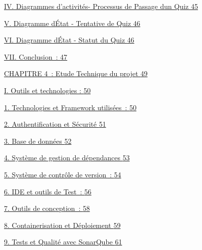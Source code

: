 \documentclass[12pt,a4paper,twoside]{report}
\begin{document}
\protect\hyperlink{diagrammes-dactivituxe9s--processus-de-passage-dun-quiz}{IV.
Diagrammes d'activités- Processus de Passage d\textquotesingle un Quiz
\protect\hyperlink{diagrammes-dactivituxe9s--processus-de-passage-dun-quiz}{45}}

\protect\hyperlink{diagramme-duxe9tat---tentative-de-quiz}{V. Diagramme
d\textquotesingle État - Tentative de Quiz
\protect\hyperlink{diagramme-duxe9tat---tentative-de-quiz}{46}}

\protect\hyperlink{diagramme-duxe9tat---statut-du-quiz}{VI. Diagramme
d\textquotesingle État - Statut du Quiz
\protect\hyperlink{diagramme-duxe9tat---statut-du-quiz}{46}}

\protect\hyperlink{conclusion-2}{VII. Conclusion~:
\protect\hyperlink{conclusion-2}{47}}

\protect\hyperlink{section-5}{CHAPITRE 4~: Etude Technique du projet
\protect\hyperlink{section-5}{49}}

\protect\hyperlink{outils-et-technologies}{I. Outils et technologies :
\protect\hyperlink{outils-et-technologies}{50}}

\protect\hyperlink{technologies-et-framework-utilisuxe9es}{1.
Technologies et Framework utilisées~:
\protect\hyperlink{technologies-et-framework-utilisuxe9es}{50}}

\protect\hyperlink{authentification-et-suxe9curituxe9}{2.
Authentification et Sécurité
\protect\hyperlink{authentification-et-suxe9curituxe9}{51}}

\protect\hyperlink{base-de-donnuxe9es}{3. Base de données
\protect\hyperlink{base-de-donnuxe9es}{52}}

\protect\hyperlink{_Toc204179721}{4. Système de gestion de dépendances
\protect\hyperlink{_Toc204179721}{53}}

\protect\hyperlink{_Toc204179722}{5. Système de contrôle de version~:
\protect\hyperlink{_Toc204179722}{54}}

\protect\hyperlink{ide-et-outils-de-test}{6. IDE et outils de Test~:
\protect\hyperlink{ide-et-outils-de-test}{56}}

\protect\hyperlink{outils-de-conception}{7. Outils de conception~:
\protect\hyperlink{outils-de-conception}{58}}

\protect\hyperlink{containerisation-et-duxe9ploiement}{8.
Containerisation et Déploiement
\protect\hyperlink{containerisation-et-duxe9ploiement}{59}}

\protect\hyperlink{tests-et-qualituxe9-avec-sonarqube}{9. Tests et
Qualité avec SonarQube
\protect\hyperlink{tests-et-qualituxe9-avec-sonarqube}{61}}
\end{document}
